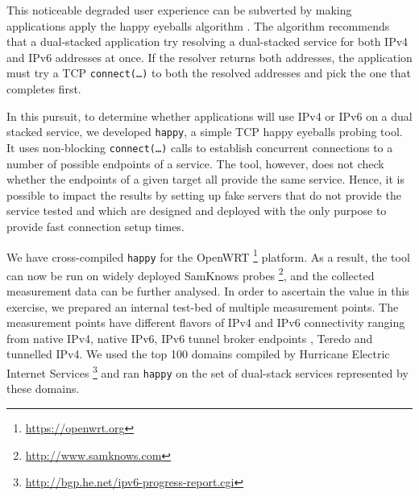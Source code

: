 This noticeable degraded user experience can be subverted by making
applications apply the happy eyeballs algorithm \cite{rfc6555}. The algorithm
recommends that a dual-stacked application try resolving a dual-stacked
service for both IPv4 and IPv6 addresses at once. If the resolver returns both
addresses, the application must try a TCP \texttt{connect(\ldots)} to both the
resolved addresses and pick the one that completes first.

In this pursuit, to determine whether applications will use IPv4 or IPv6 on a
dual stacked service, we developed \texttt{happy}, a simple TCP happy eyeballs
probing tool. It uses non-blocking \texttt{connect(\ldots)} calls to establish
concurrent connections to a number of possible endpoints of a service. The
tool, however, does not check whether the endpoints of a given target all
provide the same service. Hence, it is possible to impact the results by
setting up fake servers that do not provide the service tested and which are
designed and deployed with the only purpose to provide fast connection setup
times.

We have cross-compiled \texttt{happy} for the OpenWRT
\footnote{\url{https://openwrt.org}} platform. As a result, the tool can now
be run on widely deployed SamKnows probes
\footnote{\url{http://www.samknows.com}}, and the collected measurement data
can be further analysed. In order to ascertain the value in this exercise, we
prepared an internal test-bed of multiple measurement points. The measurement
points have different flavors of IPv4 and IPv6 connectivity ranging from
native IPv4, native IPv6, IPv6 tunnel broker endpoints \cite{rfc3053}, Teredo
\cite{rfc4380} and tunnelled IPv4. We used the top 100 domains compiled by
Hurricane Electric Internet Services
\footnote{\url{http://bgp.he.net/ipv6-progress-report.cgi}} and ran
\texttt{happy} on the set of dual-stack services represented by these domains.

